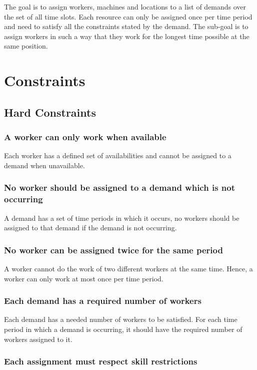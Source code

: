 \documentclass[../thesis.tex]{subfiles}
\begin{document}
The goal is to assign workers, machines and locations to a list of demands over the set of all time slots.
Each resource can only be assigned once per time period and need to satisfy all the constraints stated by the demand. 
The sub-goal is to assign workers in such a way that they work for the longest time possible at the same position.

\section{Constraints}
\subsection{Hard Constraints}

\subsubsection{A worker can only work when available}

Each worker has a defined set of availabilities and cannot be assigned to a demand when 
unavailable.

\subsubsection{No worker should be assigned to a demand which is not occurring}

A demand has a set of time periods in which it occurs,
no workers should be assigned to that demand if the demand is not 
occurring.

\subsubsection{No worker can be assigned twice for the same period} 
A worker cannot do the work of two different workers at the same time.
Hence, a worker can only work at most once per time period.

\subsubsection{Each demand has a required number of workers}

Each demand has a needed number of workers to be satisfied. 
For each time period in which a demand is occurring, it should have the required 
number of workers assigned to it.

\subsubsection{Each assignment must respect skill restrictions}
\end{document}
